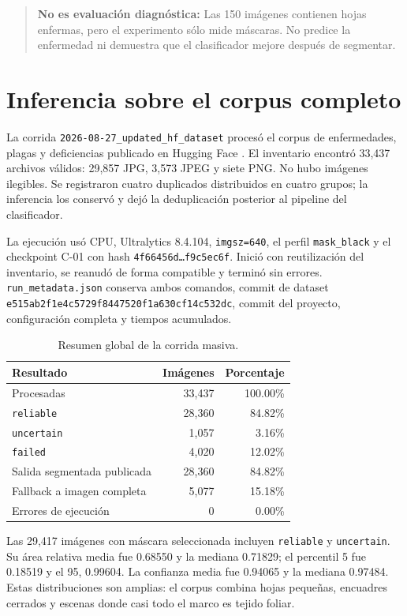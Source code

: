 \documentclass[11pt,a4paper]{article}
\begin{document}
\begin{quote}\textbf{No es evaluación diagnóstica:} Las 150 imágenes contienen hojas enfermas, pero el experimento sólo mide máscaras. No predice la enfermedad ni demuestra que el clasificador mejore después de segmentar.\end{quote}

\section{Inferencia sobre el corpus completo}

La corrida \texttt{2026-08-27\_updated\_hf\_dataset} procesó el corpus de enfermedades, plagas y deficiencias publicado en Hugging Face \citep{huggingface2026dataset}. El inventario encontró 33,437 archivos válidos: 29,857 JPG, 3,573 JPEG y siete PNG. No hubo imágenes ilegibles. Se registraron cuatro duplicados distribuidos en cuatro grupos; la inferencia los conservó y dejó la deduplicación posterior al pipeline del clasificador.


La ejecución usó CPU, Ultralytics 8.4.104, \texttt{imgsz=640}, el perfil \texttt{mask\_black} y el checkpoint C-01 con hash \texttt{4f66456d…f9c5ec6f}. Inició con reutilización del inventario, se reanudó de forma compatible y terminó sin errores. \texttt{run\_metadata.json} conserva ambos comandos, commit de dataset \texttt{e515ab2f1e4c5729f8447520f1a630cf14c532dc}, commit del proyecto, configuración completa y tiempos acumulados.


\begin{table}[H]
\centering
\caption{Resumen global de la corrida masiva.}
\small
\begin{tabular}{lrr}
\toprule
Resultado & Imágenes & Porcentaje \\
\midrule
Procesadas & 33,437 & 100.00\% \\
\texttt{reliable} & 28,360 & 84.82\% \\
\texttt{uncertain} & 1,057 & 3.16\% \\
\texttt{failed} & 4,020 & 12.02\% \\
Salida segmentada publicada & 28,360 & 84.82\% \\
Fallback a imagen completa & 5,077 & 15.18\% \\
Errores de ejecución & 0 & 0.00\% \\
\bottomrule
\end{tabular}
\end{table}

Las 29,417 imágenes con máscara seleccionada incluyen \texttt{reliable} y \texttt{uncertain}. Su área relativa media fue 0.68550 y la mediana 0.71829; el percentil 5 fue 0.18519 y el 95, 0.99604. La confianza media fue 0.94065 y la mediana 0.97484. Estas distribuciones son amplias: el corpus combina hojas pequeñas, encuadres cerrados y escenas donde casi todo el marco es tejido foliar.
\end{document}
